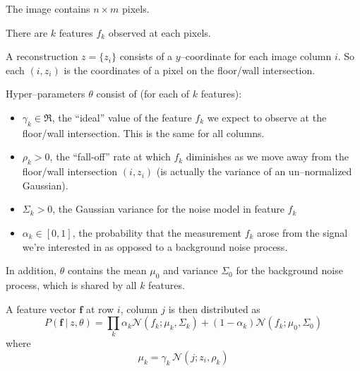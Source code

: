 \documentclass{article}
\begin{document}
\newcommand{\pd}{\partial}

\newcommand\Nrm{\mathcal{N}}

\newcommand\Ideal{\gamma}
\newcommand\FallOff{\rho}
\newcommand\NoiseVar{\Sigma}
\newcommand\Mix{\alpha}

\newcommand\Feature{f}
\newcommand\Features{\mathbf{f}}
\newcommand\Model{z}
\newcommand\Params{\theta}

\newcommand\UnderlyingF{\mu_k}

The image contains $n \times m$ pixels.

There are $k$ features $\Feature_k$ observed at each pixels.

A reconstruction $\Model=\{\Model_i\}$ consists of a $y$--coordinate
for each image column $i$. So each $(i,\Model_i)$ is the coordinates
of a pixel on the floor/wall intersection.

Hyper--parameters $\Params$ consist of (for each of $k$ features):
\begin{itemize}
  \item{$\Ideal_k\in\Re$, the ``ideal'' value of the feature $\Feature_k$ we
    expect to observe at the floor/wall intersection. This
    is the same for all columns.}
  \item{$\FallOff_k>0$, the ``fall-off'' rate at which $\Feature_k$
    diminishes as we move away from the floor/wall intersection
    $(i,z_i)$ (is actually the variance of an un--normalized
    Gaussian).}
  \item{$\NoiseVar_k > 0$, the Gaussian variance for the noise model in
    feature $\Feature_k$}
  \item{$\alpha_k \in [0,1]$, the probability that the measurement $\Feature_k$
    arose from the signal we're interested in as opposed to a
    background noise process.}
\end{itemize}

In addition, $\Params$ contains the mean $\mu_0$ and variance $\Sigma_0$ for the
background noise process, which is shared by all $k$ features.

A feature vector $\Features$ at row $i$, column $j$ is then
distributed as
\begin{equation}\label{eq:likelihood}
  P(\Features ~|~ \Model, \Params) = \prod_k
    \Mix_k \Nrm(\Feature_k; \UnderlyingF, \NoiseVar_k) +
    (1-\Mix_k) \Nrm(\Feature_k; \mu_0, \Sigma_0)
\end{equation}
where
\begin{equation}
  \UnderlyingF = \Ideal_k\, \Nrm(j; \Model_i, \rho_k)
\end{equation}
\end{document}
